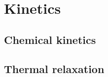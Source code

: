 \chapter{Kinetics}
\label{chap:kinetics}

\section{Chemical kinetics}

\section{Thermal relaxation}



